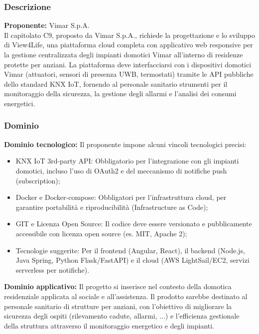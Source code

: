 \documentclass{article}
\begin{document}
	\subsubsection{Descrizione}
    \textbf{Proponente:} Vimar S.p.A.\\
	Il capitolato C9, proposto da Vimar S.p.A., richiede la progettazione e lo sviluppo di View4Life, una piattaforma cloud completa con applicativo web responsive per la gestione centralizzata degli impianti domotici Vimar all'interno di residenze protette per anziani. La piattaforma deve interfacciarsi con i dispositivi domotici Vimar (attuatori, sensori di presenza UWB, termostati) tramite le API pubbliche dello standard KNX IoT, fornendo al personale sanitario strumenti per il monitoraggio della sicurezza, la gestione degli allarmi e l'analisi dei consumi energetici.
	
	\subsubsection{Dominio}
	\textbf{Dominio tecnologico:} Il proponente impone alcuni vincoli tecnologici precisi:
    \vspace{-0.3em}
    \begin{itemize}
        \setlength\itemsep{-0.1em}
        \item {KNX IoT 3rd-party API:} Obbligatorio per l'integrazione con gli impianti domotici, incluso l'uso di OAuth2 e del meccanismo di notifiche push (subscription);
        \item {Docker e Docker-compose:} Obbligatori per l'infrastruttura cloud, per garantire portabilità e riproducibilità (Infrastructure as Code);
        \item {GIT e Licenza Open Source:} Il codice deve essere versionato e pubblicamente accessibile con licenza open source (es. MIT, Apache 2);
        \item {Tecnologie suggerite:} Per il frontend (Angular, React), il backend (Node.js, Java Spring, Python Flask/FastAPI) e il cloud (AWS LightSail/EC2, servizi serverless per notifiche).
    \end{itemize}
    \vspace{-0.3em}

    \vspace{1em}

	\textbf{Dominio applicativo:} Il progetto si inserisce nel contesto della domotica residenziale applicata al sociale e all'assistenza. Il prodotto sarebbe destinato al personale sanitario di strutture per anziani, con l'obiettivo di migliorare la sicurezza degli ospiti (rilevamento cadute, allarmi, ...) e l'efficienza gestionale della struttura attraverso il monitoraggio energetico e degli impianti.
	
\end{document}
